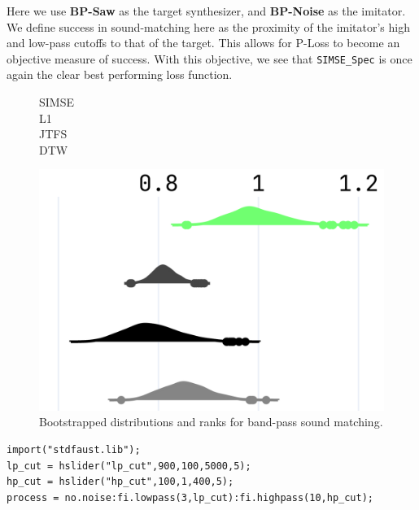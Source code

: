 \documentclass{article} %
\newcommand{\SIMSESpec}{\texttt{SIMSE\_Spec}\xspace}
\newcommand{\BPNoise}{\textbf{BP-Noise}\xspace}
\newcommand{\BPSaw}{\textbf{BP-Saw}\xspace}
\begin{document}
 Here we use \BPSaw as the target synthesizer, and \BPNoise as the imitator. We define success in sound-matching here as the proximity of the imitator's high and low-pass cutoffs to that of the target. This allows for P-Loss to become an objective measure of success. With this objective, we see that \SIMSESpec is once again the clear best performing loss function.

\begin{figure}[htbp]
  \centering
  \scriptsize
  \begin{minipage}{\columnwidth}
    \begin{minipage}{0.10\columnwidth}
      \raggedleft
      \vspace{0.5cm}
      SIMSE\\[0.6cm]
      L1\\[0.65cm]
      JTFS\\[0.65cm]
      DTW
    \end{minipage}%
    \begin{minipage}{0.88\columnwidth}
      \centering
      \includegraphics[width=\linewidth]{images/npsk_ood_P_Loss_3.png}
    \end{minipage}
  \end{minipage}
  \caption{Bootstrapped distributions and ranks for band-pass sound matching.}
  \label{fig:npsk_BP}
\end{figure}



\begin{lstlisting}[caption={\BPNoise}, label={lst:program0}, language=Faust,
                  float, floatplacement=!H, xleftmargin=1em, xrightmargin=0.5em, firstnumber=0, aboveskip=0em, belowskip=-1em]
import("stdfaust.lib");
lp_cut = hslider("lp_cut",900,100,5000,5);
hp_cut = hslider("hp_cut",100,1,400,5);
process = no.noise:fi.lowpass(3,lp_cut):fi.highpass(10,hp_cut);
\end{lstlisting}
\end{document}
